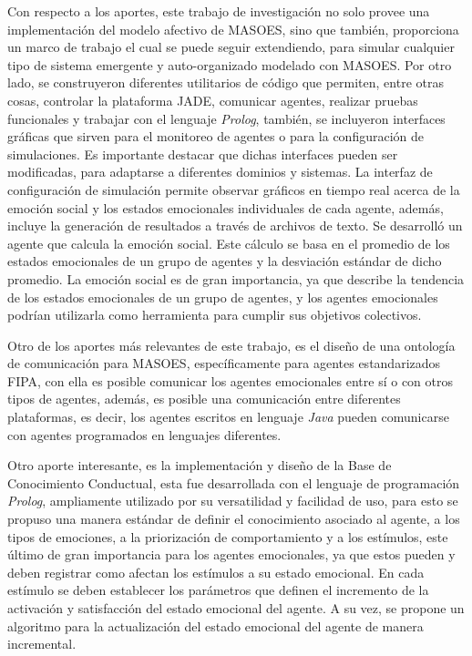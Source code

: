 Con respecto a los aportes, este trabajo de investigación no solo
provee una implementación del modelo afectivo de MASOES, sino que también,
proporciona un marco de trabajo el cual se puede seguir extendiendo,
para simular cualquier tipo de sistema emergente y auto-organizado modelado con MASOES.
Por otro lado, se construyeron diferentes utilitarios de código que permiten,
entre otras cosas, controlar la plataforma JADE, comunicar agentes, realizar pruebas funcionales y
trabajar con el lenguaje \textit{Prolog}, también, se incluyeron interfaces gráficas
que sirven para el monitoreo de agentes o para la configuración de simulaciones.
Es importante destacar que dichas interfaces pueden ser modificadas, para
adaptarse a diferentes dominios y sistemas.
La interfaz de configuración de simulación permite observar gráficos en tiempo real
acerca de la emoción social y los estados emocionales individuales de cada agente,
además, incluye la generación de resultados a través de archivos de texto.
Se desarrolló un agente que calcula la emoción social.
Este cálculo se basa en el promedio de los estados emocionales de un grupo de agentes y
la desviación estándar de dicho promedio. La emoción social es de gran importancia,
ya que describe la tendencia de los estados emocionales de un grupo de agentes,
y los agentes emocionales podrían utilizarla como herramienta para cumplir
sus objetivos colectivos.

Otro de los aportes más relevantes de este trabajo, es el diseño de una ontología de
comunicación para MASOES, específicamente para agentes estandarizados FIPA, con ella
es posible comunicar los agentes emocionales entre sí o con otros tipos de agentes,
además, es posible una comunicación entre diferentes plataformas,
es decir, los agentes escritos en lenguaje \textit{Java} pueden comunicarse
con agentes programados en lenguajes diferentes.

Otro aporte interesante, es la implementación y diseño de la Base de Conocimiento
Conductual, esta fue desarrollada con el lenguaje de programación \textit{Prolog},
ampliamente utilizado por su versatilidad y facilidad de uso, para esto
se propuso una manera estándar de definir el conocimiento asociado
al agente, a los tipos de emociones, a la priorización de comportamiento y a los estímulos,
este último de gran importancia para los agentes emocionales, ya que estos
pueden y deben registrar como afectan los estímulos a su estado emocional.
En cada estímulo se deben establecer los parámetros
que definen el incremento de la activación y satisfacción del estado emocional del agente.
A su vez, se propone un algoritmo para la
actualización del estado emocional del agente de manera incremental.


